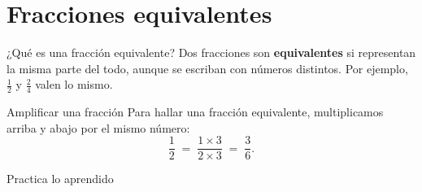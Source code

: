 

\renewcommand{\hdrcapitulo}{Ejemplo · Guías del Profe}



\section{Fracciones equivalentes}

\begin{definicion}{¿Qué es una fracción equivalente?}
Dos fracciones son \textbf{equivalentes} si representan la misma parte del todo,
aunque se escriban con números distintos. Por ejemplo, $\tfrac{1}{2}$ y
$\tfrac{2}{4}$ valen lo mismo.
\end{definicion}

\begin{ejemplo}{Amplificar una fracción}
Para hallar una fracción equivalente, multiplicamos arriba y abajo por el mismo
número:
\[
\frac{1}{2} \;=\; \frac{1\times 3}{2\times 3} \;=\; \frac{3}{6}.
\]
\end{ejemplo}

\begin{practica}{Practica lo aprendido}
\basico
{}
\intermedio
{}
\end{practica}


